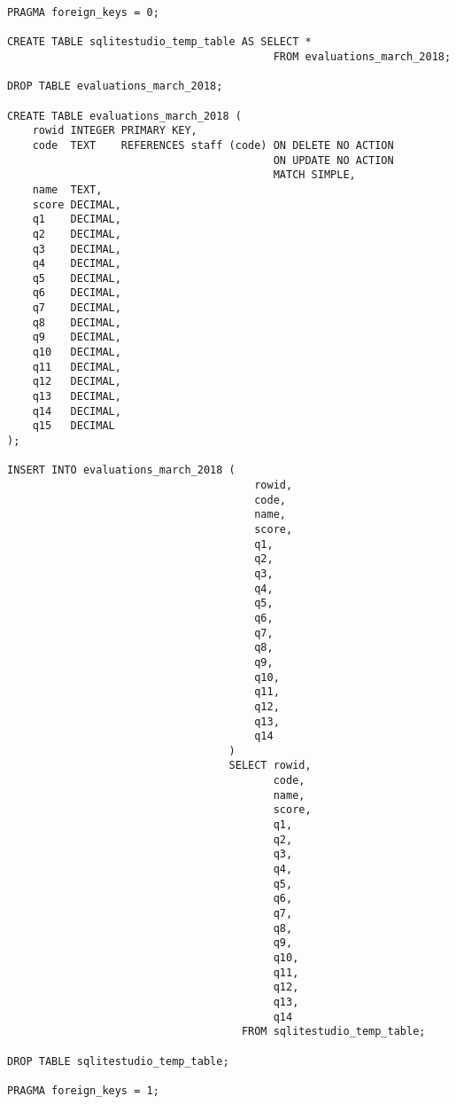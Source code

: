 \begin{verbatim}
PRAGMA foreign_keys = 0;

CREATE TABLE sqlitestudio_temp_table AS SELECT *
                                          FROM evaluations_march_2018;

DROP TABLE evaluations_march_2018;

CREATE TABLE evaluations_march_2018 (
    rowid INTEGER PRIMARY KEY,
    code  TEXT    REFERENCES staff (code) ON DELETE NO ACTION
                                          ON UPDATE NO ACTION
                                          MATCH SIMPLE,
    name  TEXT,
    score DECIMAL,
    q1    DECIMAL,
    q2    DECIMAL,
    q3    DECIMAL,
    q4    DECIMAL,
    q5    DECIMAL,
    q6    DECIMAL,
    q7    DECIMAL,
    q8    DECIMAL,
    q9    DECIMAL,
    q10   DECIMAL,
    q11   DECIMAL,
    q12   DECIMAL,
    q13   DECIMAL,
    q14   DECIMAL,
    q15   DECIMAL
);

INSERT INTO evaluations_march_2018 (
                                       rowid,
                                       code,
                                       name,
                                       score,
                                       q1,
                                       q2,
                                       q3,
                                       q4,
                                       q5,
                                       q6,
                                       q7,
                                       q8,
                                       q9,
                                       q10,
                                       q11,
                                       q12,
                                       q13,
                                       q14
                                   )
                                   SELECT rowid,
                                          code,
                                          name,
                                          score,
                                          q1,
                                          q2,
                                          q3,
                                          q4,
                                          q5,
                                          q6,
                                          q7,
                                          q8,
                                          q9,
                                          q10,
                                          q11,
                                          q12,
                                          q13,
                                          q14
                                     FROM sqlitestudio_temp_table;

DROP TABLE sqlitestudio_temp_table;

PRAGMA foreign_keys = 1;
\end{verbatim}



